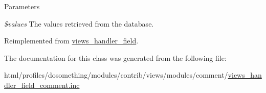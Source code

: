 \begin{DoxyParams}{Parameters}
\item[{\em \$values}]The values retrieved from the database. \end{DoxyParams}


Reimplemented from \hyperlink{classviews__handler__field_a82ff951c5e9ceb97b2eab86f880cbc1e}{views\_\-handler\_\-field}.

The documentation for this class was generated from the following file:\begin{DoxyCompactItemize}
\item 
html/profiles/dosomething/modules/contrib/views/modules/comment/\hyperlink{views__handler__field__comment_8inc}{views\_\-handler\_\-field\_\-comment.inc}\end{DoxyCompactItemize}
